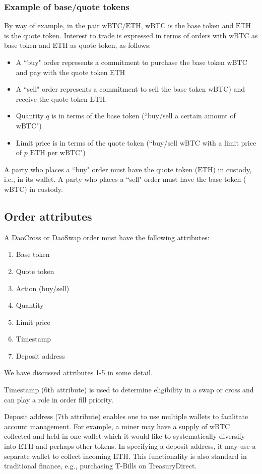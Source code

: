 \documentclass[11pt, reqno]{amsart}
\newcommand{\BTC}{\mathrm{wBTC}}
\newcommand{\ETH}{\mathrm{ETH}}
\begin{document}
\subsubsection{Example of base/quote tokens}
By way of example, in the pair $\BTC/\ETH$, $\BTC$ is the base token and $\ETH$
is the quote token. Interest to trade is expressed in terms of orders
with $\BTC$ as base token and $\ETH$ as quote token, as follows:
\begin{itemize}
	\item A ``buy" order represents a commitment to purchase the base token
        $\BTC$ and pay with the quote token $\ETH$
	\item A ``sell" order represents a commitment to sell the base token
	      $\BTC$) and receive the quote token $\ETH$.
	\item Quantity $q$ is in terms of the base token (``buy/sell a certain
	      amount of $\BTC$")
	\item Limit price is in terms of the quote token (``buy/sell $\BTC$ with a
	      limit price of $p$ $\ETH$ per $\BTC$")
\end{itemize}

A party who places a ``buy" order must have the quote token ($\ETH$) in custody,
i.e., in its wallet. A party who places a ``sell" order must have the base
token ($\BTC$) in custody.

\subsection{Order attributes}
A DaoCross or DaoSwap order must have the following attributes:
\begin{enumerate}
	\item Base token
	\item Quote token
	\item Action (buy/sell)
	\item Quantity
	\item Limit price
	\item Timestamp
	\item Deposit address
\end{enumerate}
We have discussed attributes 1-5 in some detail.

Timestamp (6th attribute) is used to determine eligibility in a swap or cross
and can play a role in order fill priority.

Deposit address (7th attribute) enables one to use multiple wallets to
facilitate account management. For example, a miner may have a supply of $\BTC$
collected and held in one wallet which it would like to systematically
diversify into $\ETH$ and perhaps other tokens. In specifying a deposit
address, it may use a separate wallet to collect incoming $\ETH$. This
functionality is also standard in traditional finance, e.g., purchasing
T-Bills on TreasuryDirect.
\end{document}
